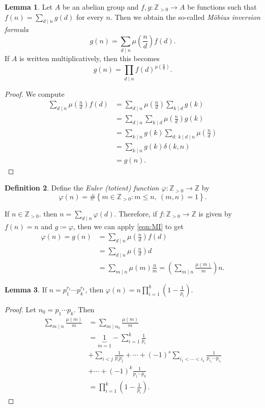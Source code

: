 \documentclass[10pt,letterpaper,cm]{nupset}
\theoremstyle{definition}
\newtheorem{definition}{Definition}[subsection]
\theoremstyle{theorem}
\newtheorem{lemma}[definition]{Lemma}
\theoremstyle{remark}
\newcommand{\Z}{\mathbb Z}
\newcommand{\1}{\mathbf{1}}
\newcommand{\0}{\vec 0}
\begin{document}
\begin{lemma}
Let $A$ be an abelian group and $f,g: \Z_{>0}\to A$ be functions such that $f(n) = \sum_{d\mid n}g(d)$ for every $n$. Then we obtain the so-called \textit{M\"{o}bius inversion formula} 
\[
\label{eqn:MI} g(n) = \sum_{d\mid n}\mu \left(\frac{n}{d} \right)f(d). \tag{$\dagger$}
\] If $A$ is written multiplicatively, then this becomes  $$g(n) = \prod_{d\mid n}f(d)^{\mu \left(\frac{n}{d} \right)}.$$
\end{lemma}
\begin{proof}
We compute
\begin{align*}
 \sum_{d\mid n}\mu \left(\frac{n}{d} \right)f(d) & = \sum_{d\mid n}\mu \left(\frac{n}{d} \right)\sum_{k\mid d}g(k)
 \\ & = \sum_{d\mid n}\sum_{k\mid d}\mu \left(\frac{n}{d} \right) g(k)
 \\ & = \sum_{k\mid n}g(k) \sum_{d:\ k\mid d \mid n}\mu \left(\frac{n}{d} \right)
 \\ & = \sum_{k\mid n}g(k) \delta(k,n)
 \\ & = g(n).
\end{align*}
\end{proof}

\begin{definition}
Define the \textit{Euler (totient) function $\varphi : \Z_{>0}\to \Z$} by $$\varphi(n)= \#\left\{m\in \Z_{>0} : m\leq  n, \ (m,n)=1\right\}.$$
\end{definition}

\smallskip

If $n\in \Z_{>0}$. then $n=\sum_{d\mid n}\varphi(d)$. Therefore, if $f: \Z_{>0} \to \Z$ is given by $f(n) =n$ and $g\coloneqq \varphi$, then we can apply \eqref{eqn:MI} to get 
\begin{align*}
 \varphi(n)  = g(n) & = \sum_{d\mid n} \mu \left(\frac{n}{d} \right)f(d)
 \\ & =  \sum_{d\mid n} \mu \left(\frac{n}{d} \right)d
 \\ & = \sum_{m \mid n} \mu(m)\frac{n}{m} =  \left( \sum_{m \mid n} \frac{\mu(m)}{m}\right) n
. \end{align*}


\begin{lemma}
If $n= p_1^{r_1} \cdots p_k^{r_k}$, then $\varphi(n) =n\prod_{i=1}^k \left(1- \frac{1}{p_i} \right)$.
\end{lemma}
\begin{proof}
Let $n_0 = p_1 \cdots p_k$. Then
\begin{align*}
\sum_{m\mid n}\frac{\mu(m)}{m} & = \sum_{m\mid n_0}\frac{\mu(m)}{m}
\\ & = \underbrace{1}_{m=1} -\sum_{i=1}^k \frac{1}{p_i}
\\ & + \sum_{i<j}\frac{1}{p_ip_j} +\cdots + ({-1})^s \sum_{i_1 < \cdots < i_s}\frac{1}{p_{i_1}\cdots p_{i_s}}
\\ & + \cdots  +({-1})^k\frac{1}{p_1\cdots p_k}
\\ & = \prod_{i=1}^k \left(1- \frac{1}{p_i}\right).
\end{align*}
\end{proof}
\end{document}
